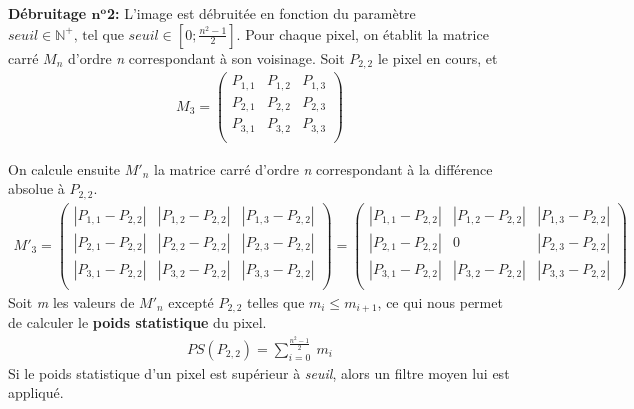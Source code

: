 \documentclass{article}
\newcommand{\N}{\mathbb{N}} %
\begin{document}
		\newpage
		
		
		\textbf{Débruitage \begin{math}\textbf{n}^\textbf{o}\end{math}2: }L'image est débruitée en fonction du paramètre \begin{math}seuil \in \N^+ \text{, tel que } seuil \in [0; \frac{n^2-1}{2} ] \end{math}. Pour chaque pixel, on établit la matrice carré \begin{math}M_n\end{math} d'ordre \emph{n} correspondant à son voisinage. Soit \begin{math}P_{2,2}\end{math} le pixel en cours, et
		 \begin{align*}M_{3} = \begin{pmatrix}
			P_{1,1} & P_{1,2} & P_{1,3}\\
			P_{2,1} & P_{2,2} & P_{2,3}\\
			P_{3,1} & P_{3,2} & P_{3,3}\\
		\end{pmatrix}\end{align*}
		
		\noindent On calcule ensuite \begin{math}M'_n\end{math} la matrice carré d'ordre \emph{n} correspondant à la différence absolue à \begin{math}P_{2,2}\end{math}.
		\begin{align*}
			M'_3 =
			\begin{pmatrix}
				|P_{1,1}-P_{2,2}| & |P_{1,2}-P_{2,2}| & |P_{1,3}-P_{2,2}|\\
				|P_{2,1}-P_{2,2}| & |P_{2,2}-P_{2,2}| & |P_{2,3}-P_{2,2}|\\
				|P_{3,1}-P_{2,2}| & |P_{3,2}-P_{2,2}| & |P_{3,3}-P_{2,2}|\\
			\end{pmatrix}
			=
			\begin{pmatrix}
				|P_{1,1}-P_{2,2}| & |P_{1,2}-P_{2,2}| & |P_{1,3}-P_{2,2}|\\
				|P_{2,1}-P_{2,2}| & 0                 & |P_{2,3}-P_{2,2}|\\
				|P_{3,1}-P_{2,2}| & |P_{3,2}-P_{2,2}| & |P_{3,3}-P_{2,2}|\\
			\end{pmatrix}
		\end{align*}
		\noindent Soit \emph{m} les valeurs de \begin{math}M'_n\end{math} excepté \begin{math}P_{2,2}\end{math}  telles que \begin{math}m_i \leq m_{i+1}\end{math}, ce qui nous permet de calculer le \textbf{poids statistique} du pixel.
		\begin{align*}
			PS(P_{2,2}) = \sum_{i=0}^{\frac{n^2-1}{2}}{\ m_i}
		\end{align*}
		Si le poids statistique d'un pixel est supérieur à \emph{seuil}, alors un filtre moyen lui est appliqué.
		
\end{document}
